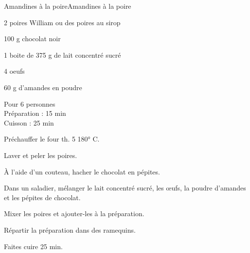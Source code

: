 \begin{recette}{Amandines à la poire}{Amandines à la poire}

\begin{ingredients}
2 poires William ou des poires au sirop \par
100 g chocolat noir \par
1 boite de 375 g de lait concentré sucré\par
4 oeufs\par
60 g d’amandes en poudre \par
\end{ingredients}

\begin{infos}
Pour 6 personnes\\
Préparation : 15 min\\
Cuisson : 25 min\\
\end{infos}

\begin{etapes}
\item Préchauffer le four th. 5 180° C.
\item Laver et peler les poires.
\item À l’aide d’un couteau, hacher le chocolat en pépites.
\item Dans un saladier, mélanger le lait concentré sucré, les œufs, la poudre d’amandes et les pépites de chocolat.
\item Mixer les poires et ajouter-les à la préparation.
\item Répartir la préparation dans des ramequins.
\item Faites cuire 25 min.
\end{etapes}

\begin{conseils}
\end{conseils}

\end{recette}